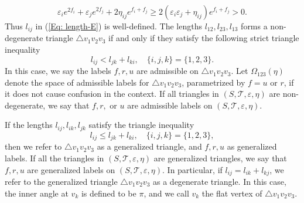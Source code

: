 \documentclass[12pt]{amsart}
\theoremstyle{definition}
\begin{document}
\begin{equation*}
\varepsilon_ie^{2f_i}+\varepsilon_je^{2f_j}
+2\eta_{ij}e^{f_i+f_j}
\geq 2(\varepsilon_i\varepsilon_j+\eta_{ij})e^{f_i+f_j}>0.
\end{equation*}
Thus $l_{ij}$ in (\ref{Eq: length-E}) is well-defined.
The lengths $l_{12},l_{23},l_{13}$ forms a non-degenerate triangle $\triangle v_1v_2v_3$ if and only if they satisfy the following strict triangle inequality
\begin{equation*}
l_{ij} < l_{jk} + l_{ki}, \quad \{i,j,k\} = \{1,2,3\}.
\end{equation*}
In this case, we say the labels $f,r,u$ are admissible on $\triangle v_1v_2v_3$. 
Let $\Omega_{123}(\eta)$ denote the space of admissible labels for $\triangle v_1v_2v_3$, parametrized by $f=u$ or $r$, if it  does not cause confusion in the context. 
If all triangles in $(S, \mathcal{T}, \varepsilon, \eta)$ are non-degenerate, we say that $f,r,$ or $u$ are admissible labels on $(S, \mathcal{T}, \varepsilon, \eta)$.

If the lengths $l_{ij},l_{ik},l_{jk}$ satisfy the triangle inequality
\begin{equation*}
l_{ij} \leq l_{jk} + l_{ki}, \quad \{i,j,k\} = \{1,2,3\},
\end{equation*}
then we refer to $\triangle v_1v_2v_3$ as a generalized triangle, and $f,r,u$ as generalized labels. 
If all the triangles in $(S, \mathcal{T}, \varepsilon, \eta)$ are generalized triangles, we say that $f,r,u$ are generalized labels on $(S, \mathcal{T}, \varepsilon, \eta)$. 
In particular, if $l_{ij}=l_{ik}+l_{kj}$, we refer to the generalized triangle $\triangle v_1v_2v_3$ as a degenerate triangle. 
In this case, the inner angle at $v_k$ is defined to be $\pi$, and we call $v_k$ the flat vertex of $\triangle v_1v_2v_3$.
\end{document}
